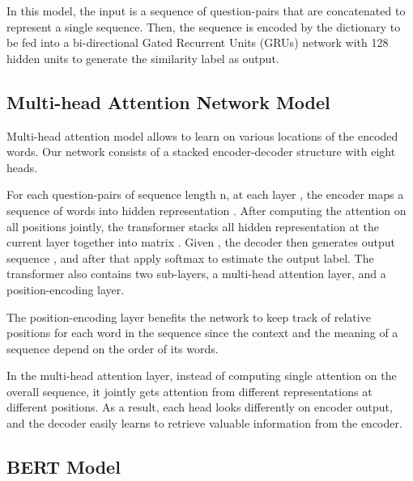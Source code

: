 \documentclass[11pt,a4paper]{article}
\begin{document}
In this model, the input is a sequence of question-pairs that are concatenated to represent a single sequence. Then, the sequence is encoded by the dictionary to be fed into a bi-directional Gated Recurrent Units (GRUs) network with 128 hidden units to generate the similarity label as output. 

\vspace{0.4pt}
 \subsection{Multi-head Attention Network Model}
Multi-head attention model \cite{vaswani2017attention} allows to learn on various locations of the encoded words. Our network consists of a stacked encoder-decoder structure with eight heads. 

For each question-pairs of sequence length n, at each layer , the encoder maps a sequence of words  into hidden representation . After computing the  attention on all positions jointly, the transformer stacks all hidden representation  at the current layer  together into matrix .  Given , the decoder then generates output sequence , and after that apply softmax to estimate the output label. 
The transformer also contains two sub-layers, a multi-head attention layer, and a position-encoding layer.

The position-encoding layer benefits the network to keep track of relative positions for each word in the sequence since the context and the meaning of a sequence depend on the order of its words. 

In the multi-head attention layer, instead of computing single attention on the overall sequence, it jointly gets attention from different representations at different positions. As a result, each head looks differently on encoder output, and the decoder easily learns to retrieve valuable information from the encoder.




\vspace{0.4pt}
\subsection{BERT Model}
\end{document}
